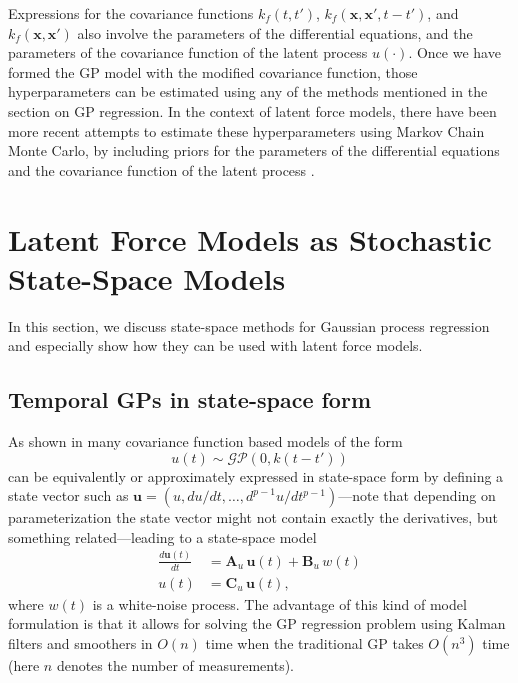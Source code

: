 \documentclass[journal]{IEEEtran}
\begin{document}
Expressions for the covariance functions $k_{f}(t,t')$, $k_{f}(\mathbf{x}, \mathbf{x}', t-t')$, and $k_{f}(\mathbf{x}, \mathbf{x}')$ also involve the parameters of the differential equations, and the parameters of the covariance function of the latent process $u(\cdot)$. Once we have formed the GP model with the modified covariance function, those hyperparameters can be estimated using any of the methods mentioned in the section on GP regression. In the context of latent force models, there have been more recent
attempts to estimate these hyperparameters using Markov Chain Monte Carlo, by including priors for the parameters of the differential equations and the covariance function of the latent process \cite{Titsias:control:vars:2009, Titsias:BMC:2012}.


\section{Latent Force Models as Stochastic State-Space Models}

In this section, we discuss state-space methods for Gaussian process regression and especially show how they can be used with latent force models. 

\subsection{Temporal GPs in state-space form} \label{sec:tempgp}
As shown in \cite{Hartikainen+Sarkka:2010,Sarkka+Solin+Hartikainen:2013,Sarkka+Piche:2014} many covariance function based models of the form
%
\begin{equation}
  u(t) \sim \mathcal{GP}(0,k(t - t'))
\end{equation}
%
can be equivalently or approximately expressed in state-space form by defining a state vector such as $\mathbf{u} = (u, du/dt,\ldots,d^{p-1}u/dt^{p-1})$---note that depending on parameterization the state vector might not contain exactly the derivatives, but something related---leading to a state-space model
%
\begin{equation}
\begin{split}
  \frac{d\mathbf{u}(t)}{dt}
  &= \mathbf{A}_u \, \mathbf{u}(t) + \mathbf{B}_u \, w(t) \\
  u(t) &= \mathbf{C}_u \, \mathbf{u}(t),
\end{split}
\label{eq:ssu}
\end{equation}
%
where $w(t)$ is a white-noise process. The advantage of this kind of model formulation is that it allows for solving the GP regression problem using Kalman filters and smoothers \cite{Sarkka:2013} in $O(n)$ time when the traditional GP takes $O(n^3)$ time (here $n$ denotes the number of measurements).
\end{document}
